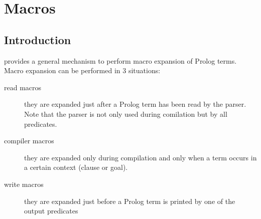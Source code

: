 %
% 
% 
% 
% 
%
%
%

\chapter{{\eclipse} Macros}
\label{chapmacros}

\section{Introduction}
{\eclipse} provides a general mechanism to perform macro expansion
of Prolog terms.
Macro expansion can be performed in 3 situations:
\begin{description}

\item[read macros]
they are expanded just after a Prolog term has been read by the
{\eclipse} parser. Note that the parser is not only used during
comilation but by all
predicates.

\item[compiler macros]
they are expanded only during compilation and only when a term occurs
in a certain context (clause or goal).

\item[write macros]
they are expanded just before a Prolog term is printed by one of the
output predicates

\end{description}

